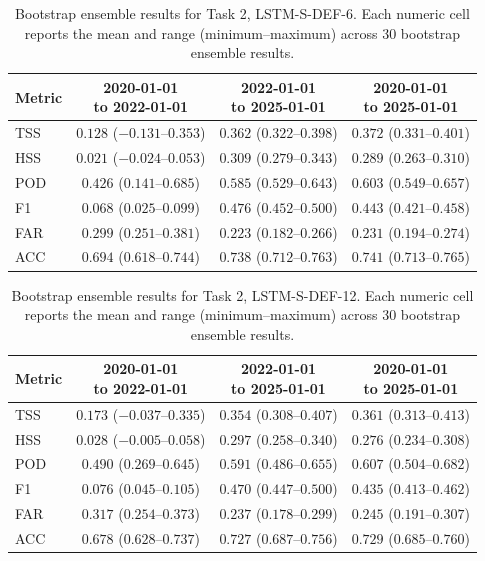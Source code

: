 \begin{table}[htbp]
\centering
\small
\caption{Bootstrap ensemble results for Task 2, LSTM-S-DEF-6. Each numeric cell reports the mean and range (minimum--maximum) across 30 bootstrap ensemble results.}
\label{tab:app-task2-lstm-s-def-6}
\begin{tabular}{lccc}
\toprule
Metric & \shortstack{2020-01-01\\to 2022-01-01} & \shortstack{2022-01-01\\to 2025-01-01} & \shortstack{2020-01-01\\to 2025-01-01} \\
\midrule
TSS & $0.128$ ($-0.131$--$0.353$) & $0.362$ ($0.322$--$0.398$) & $0.372$ ($0.331$--$0.401$) \\
HSS & $0.021$ ($-0.024$--$0.053$) & $0.309$ ($0.279$--$0.343$) & $0.289$ ($0.263$--$0.310$) \\
POD & $0.426$ ($0.141$--$0.685$) & $0.585$ ($0.529$--$0.643$) & $0.603$ ($0.549$--$0.657$) \\
F1 & $0.068$ ($0.025$--$0.099$) & $0.476$ ($0.452$--$0.500$) & $0.443$ ($0.421$--$0.458$) \\
FAR & $0.299$ ($0.251$--$0.381$) & $0.223$ ($0.182$--$0.266$) & $0.231$ ($0.194$--$0.274$) \\
ACC & $0.694$ ($0.618$--$0.744$) & $0.738$ ($0.712$--$0.763$) & $0.741$ ($0.713$--$0.765$) \\
\bottomrule
\end{tabular}
\end{table}
\clearpage

\begin{table}[htbp]
\centering
\small
\caption{Bootstrap ensemble results for Task 2, LSTM-S-DEF-12. Each numeric cell reports the mean and range (minimum--maximum) across 30 bootstrap ensemble results.}
\label{tab:app-task2-lstm-s-def-12}
\begin{tabular}{lccc}
\toprule
Metric & \shortstack{2020-01-01\\to 2022-01-01} & \shortstack{2022-01-01\\to 2025-01-01} & \shortstack{2020-01-01\\to 2025-01-01} \\
\midrule
TSS & $0.173$ ($-0.037$--$0.335$) & $0.354$ ($0.308$--$0.407$) & $0.361$ ($0.313$--$0.413$) \\
HSS & $0.028$ ($-0.005$--$0.058$) & $0.297$ ($0.258$--$0.340$) & $0.276$ ($0.234$--$0.308$) \\
POD & $0.490$ ($0.269$--$0.645$) & $0.591$ ($0.486$--$0.655$) & $0.607$ ($0.504$--$0.682$) \\
F1 & $0.076$ ($0.045$--$0.105$) & $0.470$ ($0.447$--$0.500$) & $0.435$ ($0.413$--$0.462$) \\
FAR & $0.317$ ($0.254$--$0.373$) & $0.237$ ($0.178$--$0.299$) & $0.245$ ($0.191$--$0.307$) \\
ACC & $0.678$ ($0.628$--$0.737$) & $0.727$ ($0.687$--$0.756$) & $0.729$ ($0.685$--$0.760$) \\
\bottomrule
\end{tabular}
\end{table}
\clearpage

